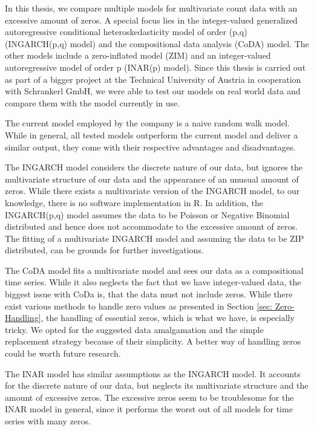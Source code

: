 In this thesis, we compare multiple models for multivariate count data with an excessive amount of zeros. A special focus lies in the integer-valued generalized autoregressive conditional heteroskedasticity model of order (p,q) (INGARCH(p,q) model) and the compositional data analysis (CoDA) model. The other models include a zero-inflated model (ZIM) and an integer-valued autoregressive model of order p (INAR(p) model). Since this thesis is carried out as part of a bigger project at the Technical University of Austria in cooperation with Schrankerl GmbH, we were able to test our models on real world data and compare them with the model currently in use. 

The current model employed by the company is a naive random walk model. While in general, all tested models outperform the current model and deliver a similar output, they come with their respective advantages and disadvantages.

The INGARCH model considers the discrete nature of our data, but ignores the multivariate structure of our data and the appearance of an unusual amount of zeros. While there exists a multivariate version of the INGARCH model, to our knowledge, there is no software implementation in R. In addition, the INGARCH(p,q) model assumes the data to be Poisson or Negative Binomial distributed and hence does not accommodate to the excessive amount of zeros. The fitting of a multivariate INGARCH model and assuming the data to be ZIP distributed, can be grounds for further investigations. 

The CoDA model fits a multivariate model and sees our data as a compositional time series. While it also neglects the fact that we have integer-valued data, the biggest issue with CoDa is, that the data must not include zeros. While there exist various methods to handle zero values as presented in Section \ref{sec: Zero-Handling}, the handling of essential zeros, which is what we have, is especially tricky. We opted for the suggested data amalgamation and the simple replacement strategy because of their simplicity. A better way of handling zeros could be worth future research. 

The INAR model has similar assumptions as the INGARCH model. It accounts for the discrete nature of our data, but neglects its multivariate structure and the amount of excessive zeros. The excessive zeros seem to be troublesome for the INAR model in general, since it performs the worst out of all models for time series with many zeros. 

